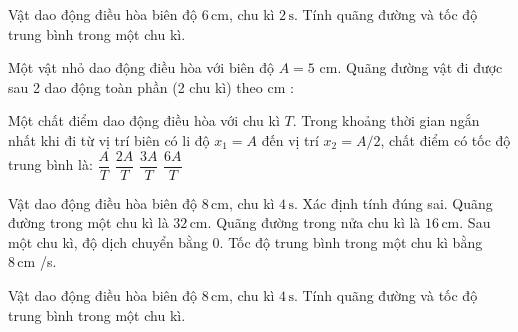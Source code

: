 \begin{ex}
Vật dao động điều hòa biên độ $6\,\text{cm}$, chu kì $2\,\text{s}$. Tính quãng đường và tốc độ trung bình trong một chu kì.
\choiceTF

\end{ex}

\begin{ex}
Một vật nhỏ dao động điều hòa với biên độ $A = 5\text{ cm}$. Quãng đường vật đi được sau 2 dao động toàn phần (2 chu kì) theo cm :
\end{ex}

\begin{ex}
Một chất điểm dao động điều hòa với chu kì $T$. Trong khoảng thời gian ngắn nhất khi đi từ vị trí biên có li độ $x_1 = A$ đến vị trí $x_2 = A/2$, chất điểm có tốc độ trung bình là:
\choice
{$\dfrac{A}{T}$}
{$\dfrac{2A}{T}$}
{\True $\dfrac{3A}{T}$}
{$\dfrac{6A}{T}$}
\end{ex}

\begin{ex}
Vật dao động điều hòa biên độ $8\,\text{cm}$, chu kì $4\,\text{s}$. Xác định tính đúng sai.
\choiceTF
{\True Quãng đường trong một chu kì là $32\,\text{cm}$.}
{\True Quãng đường trong nửa chu kì là $16\,\text{cm}$.}
{\True Sau một chu kì, độ dịch chuyển bằng 0.}
{\True Tốc độ trung bình trong một chu kì bằng $8\,\text{cm}$ /s.}
\end{ex}

\begin{ex}
Vật dao động điều hòa biên độ $8\,\text{cm}$, chu kì $4\,\text{s}$. Tính quãng đường và tốc độ trung bình trong một chu kì.
\choiceTF

\end{ex}

